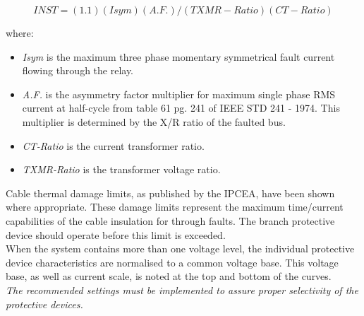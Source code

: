 \[INST = (1.1)(Isym)(A.F. )/(TXMR - Ratio)(CT - Ratio)\]
	
\noindent where:

\begin{itemize}
	\item \emph{Isym} is the maximum three phase momentary symmetrical fault current flowing through the relay.
	\item \emph{A.F.} is the asymmetry factor multiplier for maximum single phase RMS current at half-cycle from table 61 pg. 241 of IEEE STD 241 - 1974. This multiplier is determined by the X/R ratio of the faulted bus.
	\item \emph{CT-Ratio} is the current transformer ratio.
	\item \emph{TXMR-Ratio} is the transformer voltage ratio.
\end{itemize}

\noindent Cable thermal damage limits, as published by the IPCEA, have been shown where appropriate. These damage limits represent the maximum time/current capabilities of
the cable insulation for through faults. The branch protective device should operate before this limit is exceeded.\\

\noindent When the system contains more than one voltage level, the individual protective device characteristics are normalised to a common voltage base. This voltage base, as well as current scale, is noted at the top and bottom of the curves.\\

\noindent \textit{The recommended settings must be implemented to assure proper selectivity of the protective devices.}
